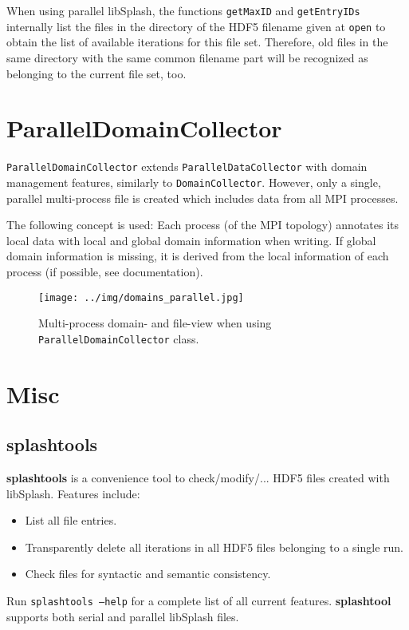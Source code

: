 \documentclass[a4paper,10pt,BCOR12mm]{report}
\newcommand{\command}[1]{\small \texttt{#1}}
\newcommand{\code}[1]{\small \texttt{#1}}
\begin{document}
When using parallel libSplash, the functions \code{getMaxID} and \code{getEntryIDs}
internally list the files in the directory of the HDF5 filename given at \code{open}
to obtain the list of available iterations for this file set.
Therefore, old files in the same directory with the same common filename part will be recognized as belonging
to the current file set, too.



\chapter{ParallelDomainCollector}

\code{ParallelDomainCollector} extends \code{ParallelDataCollector} with domain management features,
similarly to \code{DomainCollector}.
However, only a single, parallel multi-process file is created which includes data from all MPI processes.

The following concept is used: Each process (of the MPI topology)
annotates its local data with local and global domain information when writing.
If global domain information is missing, it is derived from the local information of each process
(if possible, see documentation).

\begin{figure}[h]
 \texttt{[image: ../img/domains\_parallel.jpg]}
 \caption{Multi-process domain- and file-view when using \code{ParallelDomainCollector} class.}
\end{figure}


\chapter{Misc}


\section{splashtools}

\textbf{splashtools} is a convenience tool to check/modify/... HDF5 files created with libSplash.
Features include:
\begin{itemize}
	\item List all file entries.
	\item Transparently delete all iterations in all HDF5 files belonging to a single run.
	\item Check files for syntactic and semantic consistency.
\end{itemize}
Run \command{splashtools --help} for a complete list of all current features.
\textbf{splashtool} supports both serial and parallel libSplash files.
\end{document}
